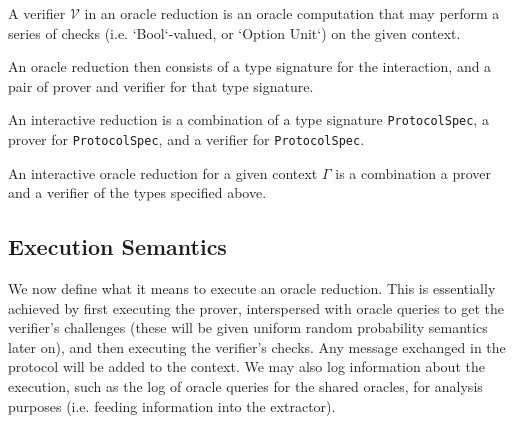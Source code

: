 \begin{definition}
    \label{def:verifier}
    A verifier $\mathcal{V}$ in an oracle reduction is an oracle computation that may perform a
    series of checks (i.e. `Bool`-valued, or `Option Unit`) on the given context.
\end{definition}

\begin{definition}
    \label{def:oracle_verifier}
\end{definition}

An oracle reduction then consists of a type signature for the interaction, and a pair of prover and
verifier for that type signature.

\begin{definition}
    \label{def:interactive_reduction}
    An interactive reduction is a combination of a type signature \verb|ProtocolSpec|, a prover for \verb|ProtocolSpec|, and a verifier for \verb|ProtocolSpec|.
\end{definition}

\begin{definition}
    \label{def:interactive_oracle_reduction}
    An interactive oracle reduction for a given context $\Gamma$ is a combination a prover and a verifier of the types specified above.
\end{definition}

\subsection{Execution Semantics}\label{sec:execution_semantics}

We now define what it means to execute an oracle reduction. This is essentially achieved by first
executing the prover, interspersed with oracle queries to get the verifier's challenges (these will
be given uniform random probability semantics later on), and then executing the verifier's checks.
Any message exchanged in the protocol will be added to the context. We may also log information
about the execution, such as the log of oracle queries for the shared oracles, for analysis purposes
(i.e. feeding information into the extractor).

\begin{definition}
    \label{def:oracle_reduction_execution}
\end{definition}

